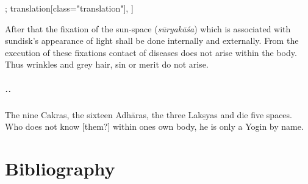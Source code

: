 \begin{alignment}[
  texts=edition[class="edition"];
  translation[class="translation"],
  ]
\begin{edition}
  \end{edition}
  \begin{translation}
    \begin{tlate}
\noindent
After that the fixation of the sun-space (\textit{sūryakāśa}) which is associated with sundisk's appearance of light shall be done internally and externally. From the execution of these fixations contact of diseases does not arise within the body. Thus wrinkles and grey hair, sin or merit do not arise.
 
\paragraph{.\textsuperscript{}.} The nine Cakras, the sixteen Adhāras, the three Lakṣyas and die five spaces. Who does not know [them?] within ones own body, he is only a Yogin by name.
    \end{tlate}
  \end{translation}
\end{alignment}


\chapter{Bibliography}
 \label{sec:bibli}
   \clearpage
\newpage 
\thispagestyle{empty}
\quad  \addtocounter{page}{-1}

\printbibliography[heading=subbibintoc, title=Consulted Manuskripts, keyword=codex]

\printbibliography[heading=subbibintoc, title=Printed Editions, keyword=printsource]

\printbibliography[heading=subbibintoc, title=Secondary Literature, keyword=seclit]

\printbibliography[heading=subbibintoc, title=Online Sources, keyword=onlinesource]






